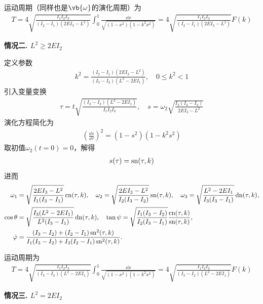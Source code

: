 运动周期（同样也是\(\vb{\omega}\)的演化周期）为
\begin{align*}
	T = 4\sqrt{\frac{I_1I_2I_3}{(I_2-I_1)(2EI_3-L^2)}}\int_0^1\frac{\dd x}{\sqrt{(1-x^2)(1-k^2x^2)}}= 4\sqrt{\frac{I_1I_2I_3}{(I_2-I_1)(2EI_3-L^2)}}F(k)
\end{align*}

\textbf{情况二.  \(L^2 \geq 2EI_2\)}

定义参数
\begin{align*}
	k^2 = \frac{(I_2-I_1)(2EI_3-L^2)}{(I_3-I_2)(L^2-2EI_1)}, \quad 0 \leq k^2 < 1
\end{align*}
引入变量变换
\begin{align*}
	\tau = t\sqrt{\frac{(I_3-I_2)(L^2-2EI_1)}{I_1I_2I_3}}, \quad
	s = \omega_2\sqrt{\frac{I_2(I_3-I_2)}{2EI_3-L^2}}
\end{align*}
演化方程简化为
\begin{align*}
	\left(\frac{\dd s}{\dd \tau}\right)^2 = (1-s^2)(1-k^2s^2)
\end{align*}
取初值\(\omega_2(t=0)=0\)，解得
\begin{align*}
	s(\tau) = \operatorname{sn}(\tau,k)
\end{align*}
进而
\begin{align*}
	\omega_1      & = \sqrt{\frac{2EI_3-L^2}{I_1(I_3-I_1)}}\operatorname{cn}(\tau,k),\quad
	\omega_2=\sqrt{\frac{2EI_3-L^2}{I_2(I_3-I_2)}} \operatorname{sn}(\tau,k),\quad
	\omega_3 = \sqrt{\frac{L^2-2EI_1}{I_3(I_3-I_1)}}\operatorname{dn}(\tau,k),                                       \\
	\cos\theta    & = \sqrt{\frac{I_3(L^2-2EI_1)}{L^2(I_3-I_1)}}\operatorname{dn}(\tau,k) ,\quad
	\tan\psi = \sqrt{\frac{I_1(I_3-I_2)}{I_2(I_3-I_1)}}\frac{\operatorname{cn}(\tau,k)}{\operatorname{sn}(\tau,k)} ,               \\
	\dot{\varphi} & = \frac{(I_3-I_2)+(I_2-I_1)\operatorname{sn}^2(\tau,k)}{I_1(I_3-I_2)+I_3(I_2-I_1)\operatorname{sn}^2(\tau,k)}.
\end{align*}

运动周期为
\begin{align*}
	T = 4 \sqrt{\frac{I_1 I_2 I_3}{(I_3 - I_2)(L^2 - 2EI_1)}} \int_0^1 \frac{\dd x}{\sqrt{(1-x^2)(1-k^2 x^2)}}= 4 \sqrt{\frac{I_1 I_2 I_3}{(I_3 - I_2)(L^2 - 2EI_1)}} F(k)
\end{align*}

\textbf{情况三.  \(L^2 = 2EI_2\)}

